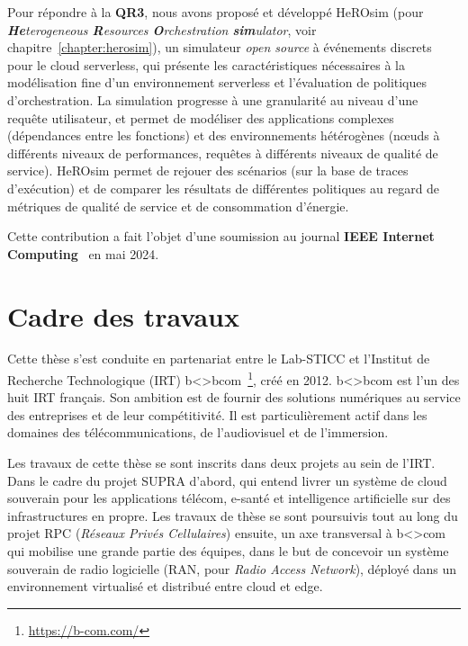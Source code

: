 Pour répondre à la \textbf{QR3}, nous avons proposé et développé HeROsim (pour \textit{\textbf{He}terogeneous \textbf{R}esources \textbf{O}rchestration \textbf{sim}ulator}, voir chapitre~\ref{chapter:herosim}), un simulateur \textit{open source} à événements discrets pour le cloud serverless, qui présente les caractéristiques nécessaires à la modélisation fine d'un environnement serverless et l'évaluation de politiques d'orchestration. La simulation progresse à une granularité au niveau d'une requête utilisateur, et permet de modéliser des applications complexes (dépendances entre les fonctions) et des environnements hétérogènes (nœuds à différents niveaux de performances, requêtes à différents niveaux de qualité de service). HeROsim permet de rejouer des scénarios (sur la base de traces d'exécution) et de comparer les résultats de différentes politiques au regard de métriques de qualité de service et de consommation d'énergie.

Cette contribution a fait l'objet d'une soumission au journal \textbf{IEEE Internet Computing}~\cite{herosim} en mai 2024.

\section{Cadre des travaux}

Cette thèse s'est conduite en partenariat entre le Lab-STICC et l'Institut de Recherche Technologique (IRT) b{\textless\textgreater}bcom~\footnote{\href{https://b-com.com/}{https://b-com.com/}}, créé en 2012. b{\textless\textgreater}bcom est l'un des huit IRT français. Son ambition est de fournir des solutions numériques au service des entreprises et de leur compétitivité. Il est particulièrement actif dans les domaines des télécommunications, de l'audiovisuel et de l'immersion.

Les travaux de cette thèse se sont inscrits dans deux projets au sein de l'IRT. Dans le cadre du projet SUPRA d'abord, qui entend livrer un système de cloud souverain pour les applications télécom, e-santé et intelligence artificielle sur des infrastructures en propre. Les travaux de thèse se sont poursuivis tout au long du projet RPC (\textit{Réseaux Privés Cellulaires}) ensuite, un axe transversal à b{\textless\textgreater}com qui mobilise une grande partie des équipes, dans le but de concevoir un système souverain de radio logicielle (RAN, pour \textit{Radio Access Network}), déployé dans un environnement virtualisé et distribué entre cloud et edge.

